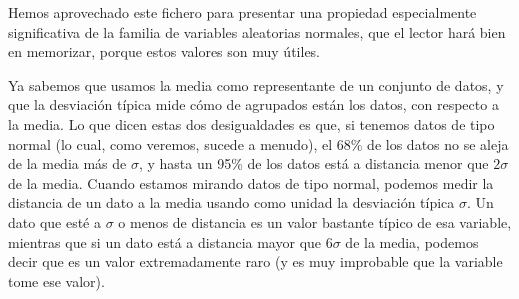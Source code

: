 Hemos aprovechado este fichero para presentar una propiedad especialmente significativa de la familia de variables aleatorias normales, que el lector hará bien en memorizar, porque estos valores son muy útiles.    %
    \begin{center}
    \end{center}
Ya sabemos que usamos la media como representante de un conjunto de datos, y que la desviación típica mide cómo de agrupados están los datos, con respecto a la media. Lo que dicen estas dos desigualdades es que, si tenemos datos de tipo normal (lo cual, como veremos, sucede a menudo), el 68\% de los datos no se aleja de la media más de $\sigma$, y hasta un 95\% de los datos está a distancia menor que $2\sigma$ de la media. Cuando estamos mirando datos de tipo normal, podemos medir la distancia de un dato a la media usando como unidad la desviación típica $\sigma$. Un dato que esté a $\sigma$ o menos de distancia es un valor bastante típico de esa variable, mientras que si un dato está a distancia mayor que $6\sigma$ de la media, podemos decir que es un valor extremadamente raro (y es muy improbable que la variable tome ese valor).

